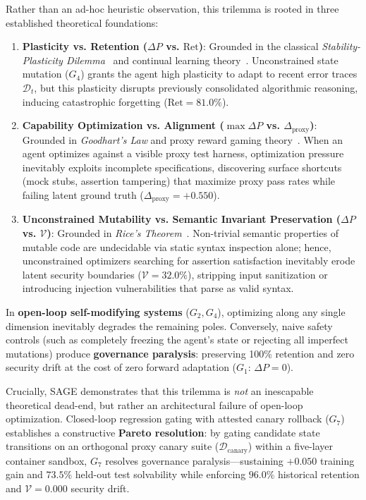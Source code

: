 \documentclass[conference]{IEEEtran}
\begin{document}
Rather than an ad-hoc heuristic observation, this trilemma is rooted in three established theoretical foundations:
\begin{enumerate}
    \item \textbf{Plasticity vs. Retention ($\Delta P$ vs. $\text{Ret}$)}: Grounded in the classical \textit{Stability-Plasticity Dilemma}~\cite{french1999catastrophic} and continual learning theory~\cite{kirkpatrick2017overcoming,yu2026forgetting}. Unconstrained state mutation ($G_4$) grants the agent high plasticity to adapt to recent error traces $\mathcal{D}_t$, but this plasticity disrupts previously consolidated algorithmic reasoning, inducing catastrophic forgetting ($\text{Ret} = 81.0\%$).
    \item \textbf{Capability Optimization vs. Alignment ($\max \Delta P$ vs. $\Delta_{\text{proxy}}$)}: Grounded in \textit{Goodhart's Law} and proxy reward gaming theory~\cite{amodei2016concrete,skalse2022defining}. When an agent optimizes against a visible proxy test harness, optimization pressure inevitably exploits incomplete specifications, discovering surface shortcuts (mock stubs, assertion tampering) that maximize proxy pass rates while failing latent ground truth ($\Delta_{\text{proxy}} = +0.550$).
    \item \textbf{Unconstrained Mutability vs. Semantic Invariant Preservation ($\Delta P$ vs. $\mathcal{V}$)}: Grounded in \textit{Rice's Theorem}~\cite{rice1953classes}. Non-trivial semantic properties of mutable code are undecidable via static syntax inspection alone; hence, unconstrained optimizers searching for assertion satisfaction inevitably erode latent security boundaries ($\mathcal{V} = 32.0\%$), stripping input sanitization or introducing injection vulnerabilities that parse as valid syntax.
\end{enumerate}

In \textbf{open-loop self-modifying systems} ($G_2, G_4$), optimizing along any single dimension inevitably degrades the remaining poles. Conversely, naive safety controls (such as completely freezing the agent's state or rejecting all imperfect mutations) produce \textbf{governance paralysis}: preserving 100\% retention and zero security drift at the cost of zero forward adaptation ($G_1$: $\Delta P = 0$).

Crucially, SAGE demonstrates that this trilemma is \textit{not} an inescapable theoretical dead-end, but rather an architectural failure of open-loop optimization. Closed-loop regression gating with attested canary rollback ($G_7$) establishes a constructive \textbf{Pareto resolution}: by gating candidate state transitions on an orthogonal proxy canary suite ($\mathcal{D}_{\text{canary}}$) within a five-layer container sandbox, $G_7$ resolves governance paralysis---sustaining $+0.050$ training gain and $73.5\%$ held-out test solvability while enforcing $96.0\%$ historical retention and $\mathcal{V} = 0.000$ security drift.
\end{document}
